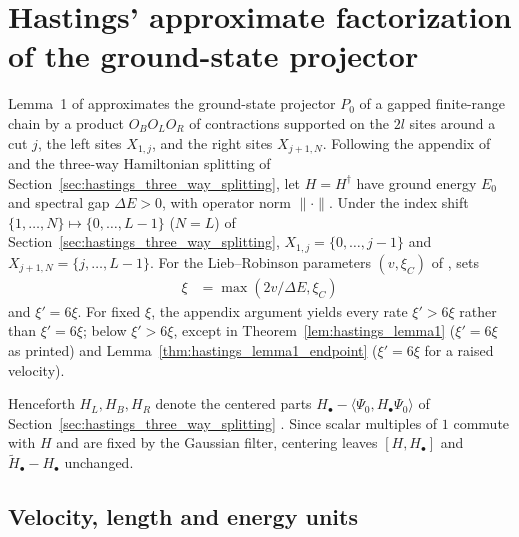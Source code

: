 \section{Hastings' approximate factorization of the ground-state projector}
\label{sec:hastings_lemma1}


Lemma~1 of \cite{Hastings2007AreaLaw} approximates the ground-state projector
$P_0$ of a gapped finite-range chain by a product $O_BO_LO_R$ of contractions
supported on the $2l$ sites around a cut $j$, the left sites $X_{1,j}$, and
the right sites $X_{j+1,N}$. Following the appendix of
\cite{Hastings2007AreaLaw} and the three-way Hamiltonian splitting of
Section~\ref{sec:hastings_three_way_splitting}, let $H=H^\dagger$ have ground
energy $E_0$ and spectral gap $\Delta E>0$, with operator norm $\|\cdot\|$.
Under the index shift $\{1,\dots,N\}\mapsto\{0,\dots,L-1\}$ ($N=L$) of
Section~\ref{sec:hastings_three_way_splitting}, $X_{1,j}=\{0,\dots,j-1\}$ and
$X_{j+1,N}=\{j,\dots,L-1\}$. For the Lieb--Robinson parameters $(v,\xi_C)$ of
\cite[lines 96--112]{Hastings2007AreaLaw}, \cite[lines 124--144]{Hastings2007AreaLaw} sets
\begin{align}
    \xi & =\max(2v/\Delta E,\xi_C)
    \label{eq:hastings_lemma1_xi}
\end{align}
and $\xi'=6\xi$. For fixed $\xi$, the appendix argument yields every rate
$\xi'>6\xi$ rather than $\xi'=6\xi$; below $\xi'>6\xi$, except in
Theorem~\ref{lem:hastings_lemma1} ($\xi'=6\xi$ as printed) and
Lemma~\ref{thm:hastings_lemma1_endpoint} ($\xi'=6\xi$ for a raised velocity).

Henceforth $H_L,H_B,H_R$ denote the centered parts
$H_\bullet-\langle\Psi_0,H_\bullet\Psi_0\rangle$ of
Section~\ref{sec:hastings_three_way_splitting}
\cite[lines 781--782]{Hastings2007AreaLaw}. Since scalar multiples of $1$
commute with $H$ and are fixed by the Gaussian filter, centering leaves
$[H,H_\bullet]$ and $\widetilde H_\bullet-H_\bullet$ unchanged.

\subsection*{Velocity, length and energy units}

